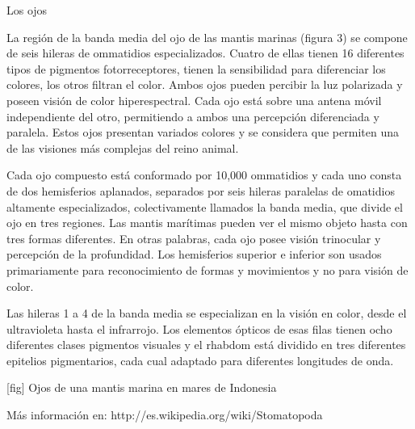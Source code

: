 \documentclass[10pt,letterpaper,twocolumn]{article}
\begin{document}
Los ojos

La región de la banda media del ojo de las mantis marinas (figura 3) se compone de seis hileras de ommatidios especializados. Cuatro de ellas tienen 16 diferentes tipos de pigmentos fotorreceptores, tienen la sensibilidad para diferenciar los colores, los otros filtran el color. Ambos ojos pueden percibir la luz polarizada y poseen visión de color hiperespectral. Cada ojo está sobre una antena móvil independiente del otro, permitiendo a ambos una percepción diferenciada y paralela. Estos ojos presentan variados colores y se considera que permiten una de las visiones más complejas del reino animal.

Cada ojo compuesto está conformado por 10,000 ommatidios y cada uno consta de dos hemisferios aplanados, separados por seis hileras paralelas de omatidios altamente especializados, colectivamente llamados la banda media, que divide el ojo en tres regiones. Las mantis marítimas pueden ver el mismo objeto hasta con tres formas diferentes. En otras palabras, cada ojo posee visión trinocular y percepción de la profundidad. Los hemisferios superior e inferior son usados primariamente para reconocimiento de formas y movimientos y no para visión de color.

Las hileras 1 a 4 de la banda media se especializan en la visión en color, desde el ultravioleta hasta el infrarrojo. Los elementos ópticos de esas filas tienen ocho diferentes clases pigmentos visuales y el rhabdom está dividido en tres diferentes epitelios pigmentarios, cada cual adaptado para diferentes longitudes de onda.

[fig] Ojos de una mantis marina en mares de Indonesia

Más información en:  http://es.wikipedia.org/wiki/Stomatopoda
\end{document}
